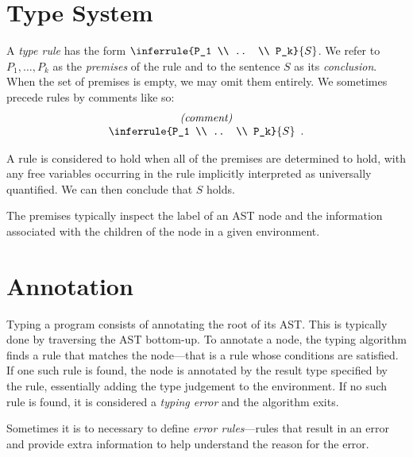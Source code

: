 \documentclass{book}
\newcommand\RuleComment[1]{\textit{(#1)}}
\begin{document}
\section{Type System}
A \emph{type rule} has the form $\inferrule{P_1 \\ .. \\ P_k}{S}$. We refer to $P_1,\ldots,P_k$ as the \emph{premises} of the rule and to the sentence $S$ as its \emph{conclusion}. When the set of premises is empty, we may omit them entirely.
%
We sometimes precede rules by comments like so:
\[
\begin{array}{c}
\RuleComment{comment}\\
\inferrule{P_1 \\ .. \\ P_k}{S} \enspace.
\end{array} 
\]

A rule is considered to hold when all of the premises are determined to hold, with any  free variables occurring in the rule implicitly interpreted as universally quantified. We can then conclude that $S$ holds.

The premises typically inspect the label of an AST node and the information associated with the children of the node in a given environment.

\section{Annotation}
\begin{comment}
The formalism doesn't actually use the annotate functions. Come back to this later.
\end{comment}

Typing a program consists of annotating the root of its AST. This is typically
done by traversing the AST bottom-up.  To annotate a node, the typing algorithm
finds a rule that matches the node---that is a rule whose conditions are
satisfied. If one such rule is found, the node is annotated by the  result type
specified by the rule, essentially adding the type judgement to the
environment.  If no such rule is found, it is considered a \emph{typing error}
and the algorithm exits.

Sometimes it is to necessary to define \emph{error rules}---rules that result
in an error and provide extra information to help understand the reason for the
error.
\end{document}
